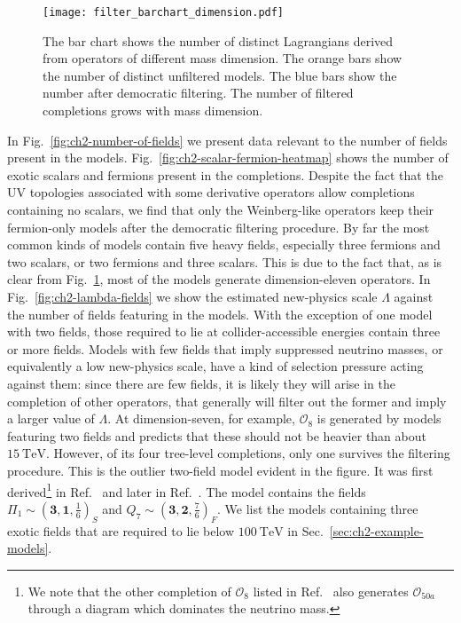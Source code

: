 \begin{figure}[t]
  \centering
  \texttt{[image: filter\_barchart\_dimension.pdf]}
  \caption[The bar chart shows the number of distinct Lagrangians derived from
  operators of different mass dimension.]{The bar chart shows the number of
    distinct Lagrangians derived from operators of different mass dimension. The
    orange bars show the number of distinct unfiltered models. The blue bars
    show the number after democratic filtering. The number of filtered
    completions grows with mass dimension.}
  \label{fig:ch2-filter-bar-dimension}
\end{figure}

In Fig.~\ref{fig:ch2-number-of-fields} we present data relevant to the number of
fields present in the models. Fig.~\ref{fig:ch2-scalar-fermion-heatmap} shows the
number of exotic scalars and fermions present in the completions. Despite the
fact that the UV topologies associated with some derivative operators allow
completions containing no scalars, we find that only the Weinberg-like operators
keep their fermion-only models after the democratic filtering procedure. By far
the most common kinds of models contain five heavy fields, especially three
fermions and two scalars, or two fermions and three scalars. This is due to the
fact that, as is clear from Fig.~\ref{fig:ch2-filter-bar-dimension}, most of the
models generate dimension-eleven operators. In Fig.~\ref{fig:ch2-lambda-fields} we
show the estimated new-physics scale $\Lambda$ against the number of fields
featuring in the models. With the exception of one model with two fields, those
required to lie at collider-accessible energies contain three or more fields.
Models with few fields that imply suppressed neutrino masses, or equivalently a
low new-physics scale, have a kind of selection pressure acting against them:
since there are few fields, it is likely they will arise in the completion of
other operators, that generally will filter out the former and imply a larger
value of $\Lambda$. At dimension-seven, for example, $\mathcal{O}_{8}$ is
generated by models featuring two fields and predicts that these should not be
heavier than about $\SI{15}{\TeV}$. However, of its four tree-level completions,
only one survives the filtering procedure. This is the outlier two-field model
evident in the figure. It was first derived\footnote{We note that the other
  completion of $\mathcal{O}_{8}$ listed in Ref.~\cite{Cai:2014kra} also
  generates $\mathcal{O}_{50a}$ through a diagram which dominates the neutrino
  mass.} in Ref.~\cite{Cai:2014kra} and later in Ref.~\cite{Klein:2019iws}. The
model contains the fields
$\Pi_{1} \sim (\mathbf{3}, \mathbf{1}, \tfrac{1}{6})_{S}$ and
$Q_{7} \sim (\mathbf{3}, \mathbf{2}, \tfrac{7}{6})_{F}$. We list the models
containing three exotic fields that are required to lie below $\SI{100}{\TeV}$
in Sec.~\ref{sec:ch2-example-models}.

